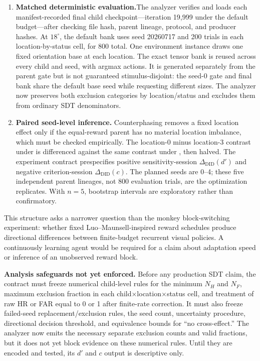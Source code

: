 \documentclass[10pt]{article}
\newcommand{\code}[1]{\texttt{\detokenize{#1}}}
\begin{document}
\begin{enumerate}[leftmargin=1.5em,itemsep=4pt]
\item \textbf{Matched deterministic evaluation.}\newline The analyzer verifies and loads each manifest-recorded final child checkpoint---iteration 19,999 under the default budget---after checking file hash, parent lineage, protocol, and producer hashes. At $18^\circ$, the default bank uses seed 20260717 and 200 trials in each location-by-status cell, for 800 total. One environment instance draws one fixed orientation base at each location. The exact tensor bank is reused across every child and seed, with argmax actions. It is generated separately from the parent gate but is not guaranteed stimulus-disjoint: the seed-0 gate and final bank share the default base seed while requesting different sizes. The analyzer now preserves both exclusion categories by location/status and excludes them from ordinary SDT denominators.
\item \textbf{Paired seed-level inference.} Counterphasing removes a fixed location effect only if the equal-reward parent has no material location imbalance, which must be checked empirically. The location-0 minus location-3 contrast under \code{condition_loc=0} is differenced against the same contrast under \code{condition_loc=3}, then halved. The experiment contract prespecifies positive sensitivity-session $\Delta_{\mathrm{DID}}(d')$ and negative criterion-session $\Delta_{\mathrm{DID}}(c)$. The planned seeds are 0--4; these five independent parent lineages, not 800 evaluation trials, are the optimization replicates. With $n=5$, bootstrap intervals are exploratory rather than confirmatory.
\end{enumerate}

This structure asks a narrower question than the monkey block-switching experiment: whether fixed Luo--Maunsell-inspired reward schedules produce directional differences between finite-budget recurrent visual policies. A continuously learning agent would be required for a claim about adaptation speed or inference of an unobserved reward block.

\colorbox{warn}{\parbox{0.96\linewidth}{
\textbf{Analysis safeguards not yet enforced.} Before any production SDT claim, the contract must freeze numerical child-level rules for the minimum $N_H$ and $N_F$, maximum exclusion fraction in each child$\times$location$\times$status cell, and treatment of raw HR or FAR equal to 0 or 1 after finite-rate correction. It must also freeze failed-seed replacement/exclusion rules, the seed count, uncertainty procedure, directional decision threshold, and equivalence bounds for ``no cross-effect.'' The analyzer now emits the necessary separate exclusion counts and valid fractions, but it does not yet block evidence on these numerical rules. Until they are encoded and tested, its $d'$ and $c$ output is descriptive only.
}}
\end{document}
